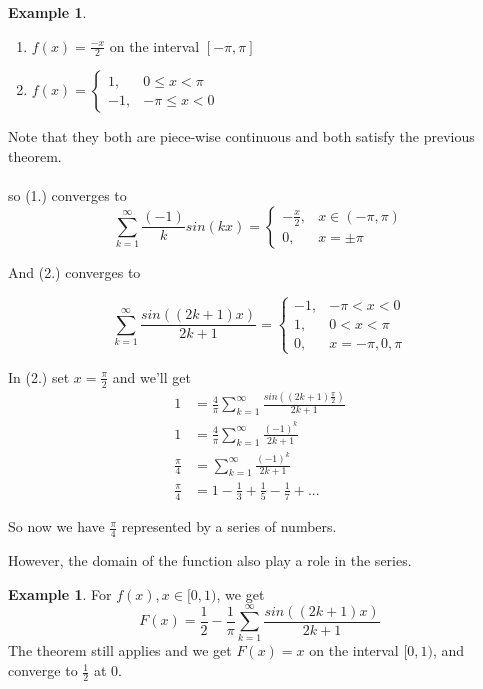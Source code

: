 \documentclass[12pt]{article}
\theoremstyle{plain}
\theoremstyle{definition}
\newtheorem{example}[theorem]{Example}
\begin{document}
\begin{example}
	\begin{enumerate}
		\item $f(x) = \frac{-x}{2}$ on the interval $[-\pi, \pi]$
		\item $f(x) = \begin{cases}
			1, &0\leq x < \pi\\
			-1, &-\pi\leq x < 0
		\end{cases}
$
	\end{enumerate}
	Note that they both are piece-wise continuous and both satisfy the previous theorem.\\
	\\
	so (1.) converges to
	$$\sum^\infty_{k=1} \frac{(-1)}{k} sin(kx) = \begin{cases}
		-\frac{x}{2}, &x\in (-\pi, \pi)\\
		0, &x = \pm \pi
	\end{cases}
$$

And (2.) converges to

$$\sum^\infty_{k=1} \frac{sin((2k+1)x)}{2k+1} = \begin{cases}
		-1, &-\pi < x < 0\\
		1, &0 < x < \pi\\
		0, &x = -\pi, 0,\pi
	\end{cases}
$$

In (2.) set $x = \frac{\pi}{2}$ and we'll get
\begin{align*}
	1 &= \frac{4}{\pi}\sum^\infty_{k=1} \frac{sin((2k+1)\frac{\pi}{2})}{2k+1}\\
	1 &=\frac{4}{\pi}\sum^\infty_{k=1} \frac{(-1)^k}{2k+1}\\
	\frac{\pi}{4}&= \sum^\infty_{k=1} \frac{(-1)^k}{2k+1}\\
	\frac{\pi}{4}&=1-\frac{1}{3}+\frac{1}{5}-\frac{1}{7}+...
\end{align*}

So now we have $\frac{\pi}{4}$ represented by a series of numbers.

\end{example}

However, the domain of the function also play a role in the series.

\begin{example}
	For $f(x), x\in[0,1)$, we get
	$$F(x) = \frac{1}{2} - \frac{1}{\pi}\sum^\infty_{k=1} \frac{sin((2k+1)x)}{2k+1}$$
	The theorem still applies and we get $F(x) = x$ on the interval $[0,1)$, and converge to $\frac{1}{2}$ at $0$.
\end{example}
\end{document}
